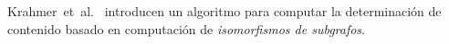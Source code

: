 %
%
%



%
%
%
%





Krahmer~et~al.~\cite{Krahmer2003} introducen un algoritmo para computar la determinaci\'on de
contenido basado en computaci\'on de \emph{isomorfismos de subgrafos}.

